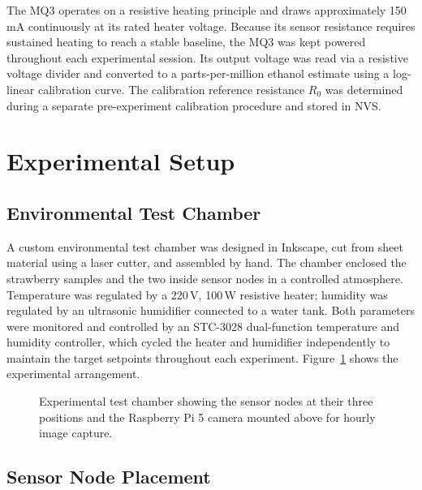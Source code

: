 The MQ3 operates on a resistive heating principle and draws approximately 150\,mA continuously at its rated heater voltage. Because its sensor resistance requires sustained heating to reach a stable baseline, the MQ3 was kept powered throughout each experimental session. Its output voltage was read via a resistive voltage divider and converted to a parts-per-million ethanol estimate using a log-linear calibration curve. The calibration reference resistance $R_0$ was determined during a separate pre-experiment calibration procedure and stored in NVS.

\section{Experimental Setup}

\subsection{Environmental Test Chamber}

A custom environmental test chamber was designed in Inkscape, cut from sheet material using a laser cutter, and assembled by hand. The chamber enclosed the strawberry samples and the two inside sensor nodes in a controlled atmosphere. Temperature was regulated by a 220\,V, 100\,W resistive heater; humidity was regulated by an ultrasonic humidifier connected to a water tank. Both parameters were monitored and controlled by an STC-3028 dual-function temperature and humidity controller, which cycled the heater and humidifier independently to maintain the target setpoints throughout each experiment. Figure~\ref{fig:experimental_setup} shows the experimental arrangement.

\begin{figure}[H]
    \centering
    \caption{Experimental test chamber showing the sensor nodes at their three positions and the Raspberry Pi 5 camera mounted above for hourly image capture.}
    \label{fig:experimental_setup}
\end{figure}

\subsection{Sensor Node Placement}

